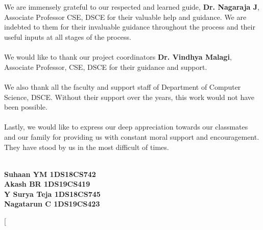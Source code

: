 \documentclass[12pt,a4paper,twocolumn,fleqn]{article}
\begin{document}
\\
\hfill
\\
We are immensely grateful to our respected and learned guide, \textbf{Dr. Nagaraja J}, Associate Professor CSE, DSCE  for their valuable help and guidance. We are indebted to them for their invaluable guidance throughout the process and their useful inputs at all stages of the process.
\\
\hfill
\\
We would like to thank our project coordinators \textbf{Dr. Vindhya Malagi}, Associate Professor, CSE, DSCE for their guidance and support.
\\
\hfill
\\
We also thank all the faculty and support staff of Department of Computer Science, DSCE. Without their support over the years, this work would not have been possible.
\\
\hfill
\\
Lastly, we would like to express our deep appreciation towards our classmates and our family for providing us with constant moral support and encouragement. They have stood by us in the most difficult of times.
\\
\hfill
\\
\begin{flushright}
\textbf{Suhaan YM \space 1DS18CS742} \\
\textbf{Akash BR \space 1DS19CS419} \\
\textbf{Y Surya Teja \space 1DS18CS745} \\ 
\textbf{Nagatarun C \space 1DS19CS423} \\ 
\end{flushright}
\newpage
  \pagestyle{fancy}
  \fancyhf{}
\renewcommand{\headrulewidth}{0pt}
\twocolumn[
\end{document}

